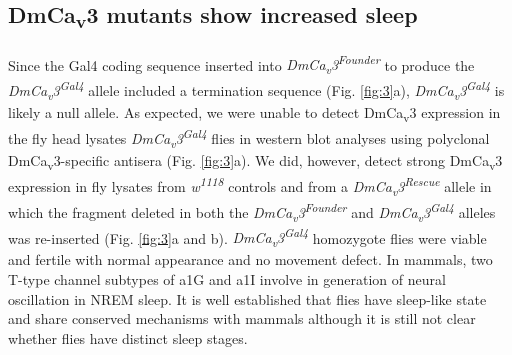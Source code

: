 \subsection*{DmCa\textsubscript{v}3 mutants show increased sleep}

Since the Gal4 coding sequence inserted into \emph{DmCa\textsubscript{v}3\textsuperscript{Founder}} to produce the \emph{DmCa\textsubscript{v}3\textsuperscript{Gal4}} allele included a termination sequence (Fig. \ref{fig:3}a), \emph{DmCa\textsubscript{v}3\textsuperscript{Gal4}} is likely a null allele.
As expected, we were unable to detect DmCa\textsubscript{v}3 expression in the fly head lysates \emph{DmCa\textsubscript{v}3\textsuperscript{Gal4}} flies in western blot analyses using polyclonal DmCa\textsubscript{v}3-specific antisera (Fig. \ref{fig:3}a). We did, however, detect strong DmCa\textsubscript{v}3 expression in fly lysates from \emph{w\textsuperscript{1118}} controls and from a \emph{DmCa\textsubscript{v}3\textsuperscript{Rescue}} allele in which the fragment deleted in both the \emph{DmCa\textsubscript{v}3\textsuperscript{Founder}} and \emph{DmCa\textsubscript{v}3\textsuperscript{Gal4}} alleles was re-inserted (Fig. \ref{fig:3}a and b).
\emph{DmCa\textsubscript{v}3\textsuperscript{Gal4}} homozygote flies were viable and fertile with normal appearance and no movement defect.
In mammals, two T-type channel subtypes of a1G and a1I involve in generation of neural oscillation in NREM sleep.
It is well established that flies have sleep-like state and share conserved mechanisms with mammals although it is still not clear whether flies have distinct sleep stages.

